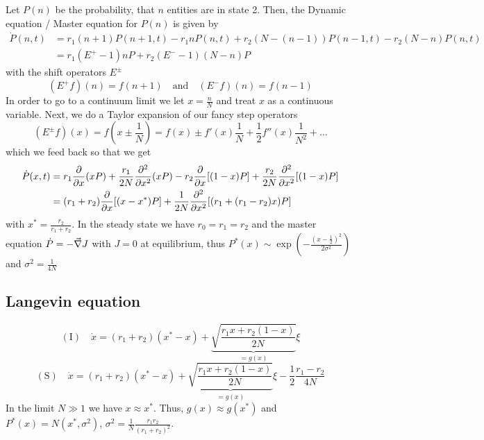 \documentclass{notebook}
\begin{document}
Let $P(n)$ be the probability, that $n$ entities are in state 2. Then, the Dynamic equation / Master equation for $P(n)$ is given by
%
\begin{align*}
\dot{P}(n,t) &= r_1 (n+1) P(n+1, t) - r_1 n P(n,t) + r_2 (N - (n-1)) P(n-1,t) - r_2 (N - n) P(n,t) \\
&= r_1 (E^+ - 1) n P + r_2 (E^- - 1)(N-n) P
\end{align*}
%
with the shift operators $E^{\pm}$
%
\begin{equation*}
	(E^+ f)(n) = f(n+1) \quad \mathrm{and} \quad (E^- f)(n) = f(n-1)
\end{equation*}
%
In order to go to a continuum limit we let $x = \frac{n}{N}$ and treat $x$ as a continuous variable. Next, we do a Taylor expansion of our fancy step operators
%
\begin{equation*}
	(E^{\pm} f)(x) = f(x \pm \frac{1}{N}) = f(x) \pm f'(x) \frac{1}{N} + \frac{1}{2} f''(x) \frac{1}{N^2} + \dots
\end{equation*}
%
which we feed back so that we get
%
\begin{align*}
\dot{P}(x,t) &= r_1 \pdv{x}(x P) + \frac{r_1}{2 N} \pdv[2]{x}(x P) - r_2 \pdv{x} [(1-x) P] + \frac{r_2}{2 N} \pdv[2]{x}[(1-x)P] \\
&= (r_1 + r_2) \pdv{x} [(x-x^*)P] + \frac{1}{2 N} \pdv[2]{x} [(r_1 + (r_1-r_2)x)P]
\end{align*}
%
with $x^* = \frac{r_2}{r_1 + r_2}$. In the steady state we have $r_0 = r_1 = r_2$ and the master equation $\dot{P} = - \vec{\nabla} J$ with $J = 0$ at equilibrium, thus $P^*(x) \sim \exp(- \frac{(x- \frac{1}{2})^2}{2 \sigma^2})$ and $\sigma^2 = \frac{1}{4 N}$

\subsection*{Langevin equation}

%
\begin{equation}
\mathrm{(I)} \quad \dot{x} = (r_1 + r_2) (x^* - x) + \underbrace{\sqrt{\frac{r_1 x + r_2 (1-x)}{2 N}}}_{ = g(x)} \xi
\end{equation}
%
%
\begin{equation}
\mathrm{(S)} \quad \dot{x} = (r_1 + r_2) (x^* - x) + \underbrace{\sqrt{\frac{r_1 x + r_2 (1-x)}{2 N}}}_{ = g(x)} \xi - \frac{1}{2} \frac{r_1 - r_2}{4 N}
\end{equation}
%
In the limit $N \gg 1$ we have $x \approx x^*$. Thus, $g(x) \approx g(x^*)$ and $P^*(x) = N(x^*, \sigma^2)$, $\sigma^2 = \frac{1}{N} \frac{r_1 r_2}{(r_1 + r_2)^2}$.
\end{document}
